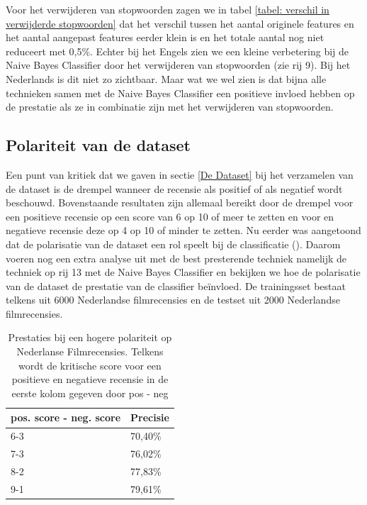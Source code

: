 Voor het verwijderen van stopwoorden zagen we in tabel \ref{tabel: verschil in verwijderde stopwoorden} dat het verschil tussen het aantal originele features en het aantal aangepast features eerder klein is en het totale aantal nog niet reduceert met 0,5\%. Echter bij het Engels zien we een kleine verbetering bij de Naive Bayes Classifier door het verwijderen van stopwoorden (zie rij 9). Bij het Nederlands is dit niet zo zichtbaar. Maar wat we wel zien is dat bijna alle technieken samen met de Naive Bayes Classifier een positieve invloed hebben op de prestatie als ze in combinatie zijn met het verwijderen van stopwoorden.\\

\subsection{Polariteit van de dataset}

Een punt van kritiek dat we gaven in sectie \ref{De Dataset} bij het verzamelen van de dataset is de drempel wanneer de recensie als positief of als negatief wordt beschouwd. Bovenstaande resultaten zijn allemaal bereikt door de drempel voor een positieve recensie op een score van 6 op 10 of meer te zetten en voor en negatieve recensie deze op 4 op 10 of minder te zetten.
Nu eerder was aangetoond dat de polarisatie van de dataset een rol speelt bij de classificatie (\cite{maas-EtAl:2011:ACL-HLT2011}). Daarom voeren nog een extra analyse uit met de best presterende techniek namelijk de techniek op rij 13 met de Naive Bayes Classifier en bekijken we hoe de polarisatie van de dataset de prestatie van de classifier be\"invloed. De trainingsset bestaat telkens uit 6000 Nederlandse filmrecensies en de testset uit 2000 Nederlandse filmrecensies.


\begin{table}[H]
\centering
\begin{tabular}{|l|l|}
\hline
\cline{2-2}
pos. score - neg. score    & Precisie \\ \hline
\multicolumn{1}{|l|}{6-3} & 70,40\%  \\ \hline
\multicolumn{1}{|l|}{7-3} & 76,02\%  \\ \hline
\multicolumn{1}{|l|}{8-2} & 77,83\%  \\ \hline
\multicolumn{1}{|l|}{9-1} & 79,61\%  \\ \hline
\end{tabular}
\caption{Prestaties bij een hogere polariteit op Nederlanse Filmrecensies. Telkens wordt de kritische score voor een positieve en negatieve recensie in de eerste kolom gegeven door pos - neg  }
\end{table}



